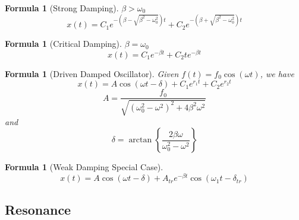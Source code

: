\documentclass[12pt]{article}
\newtheorem{for}[thm]{Formula}
\theoremstyle{definition}
\theoremstyle{remark}
\numberwithin{equation}{section}
\begin{document}
\vspace{15pt}

\begin{for}[Strong Damping]
        $\beta > \omega_0$\begin{equation}
                x(t) = C_1e^{-(\beta - \sqrt{\beta^2 - \omega_0^2})t}+C_2e^{-(\beta+\sqrt{\beta^2-\omega_0^2})t}
        \end{equation}
\end{for}


\vspace{15pt}

\begin{for}[Critical Damping]
        $\beta = \omega_0$\begin{equation}
                x(t) = C_1e^{-\beta t} + C_2te^{-\beta t}
        \end{equation}
\end{for}


\vspace{15pt}

\begin{for}[Driven Damped Oscillator]
        Given $f(t) = f_0\cos(\omega t)$, we have \begin{equation}
                x(t) = A\cos(\omega t - \delta) + C_1e^{r_1t}+C_2e^{r_2t}
        \end{equation}
        \begin{equation}
                A = \frac{f_0}{\sqrt{(\omega_0^2-\omega^2)^2+4\beta^2\omega^2}}\label{A}
        \end{equation}
        and \begin{equation}
                \delta = \arctan\left\{\frac{2\beta\omega}{\omega_0^2-\omega^2}\right\}\label{delta}
        \end{equation}
\end{for}



\vspace{15pt}

\begin{for}[Weak Damping Special Case]
        \begin{equation}
                x(t) = A\cos(\omega t - \delta) + A_{tr}e^{-\beta t}\cos(\omega_1 t - \delta_{tr})
        \end{equation}
\end{for}

\vspace{15pt}

\subsection{Resonance}
\end{document}
